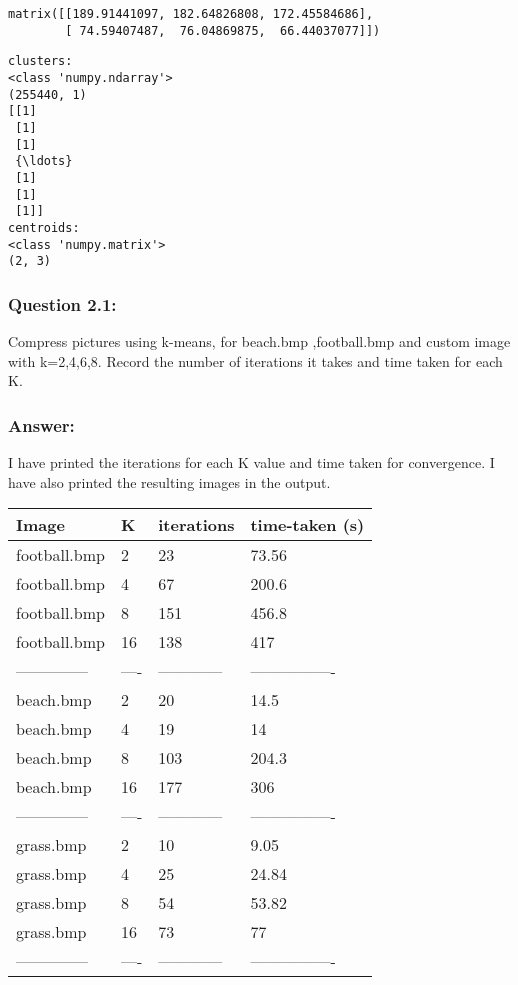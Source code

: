 \documentclass[11pt]{article}
\begin{document}
    
    \begin{verbatim}
matrix([[189.91441097, 182.64826808, 172.45584686],
        [ 74.59407487,  76.04869875,  66.44037077]])
    \end{verbatim}

    
    \begin{Verbatim}[commandchars=\\\{\}]
clusters:
<class 'numpy.ndarray'>
(255440, 1)
[[1]
 [1]
 [1]
 {\ldots}
 [1]
 [1]
 [1]]
centroids:
<class 'numpy.matrix'>
(2, 3)
    \end{Verbatim}

    \hypertarget{question-2.1}{%
\subsubsection{Question 2.1:}\label{question-2.1}}

Compress pictures using k-means, for beach.bmp ,football.bmp and custom
image with k=2,4,6,8. Record the number of iterations it takes and time
taken for each K.

\hypertarget{answer}{%
\subsubsection{Answer:}\label{answer}}

I have printed the iterations for each K value and time taken for
convergence. I have also printed the resulting images in the output.

\begin{longtable}[]{@{}llll@{}}
\toprule
Image & K & iterations & time-taken (s) \\
\midrule
\endhead
football.bmp & 2 & 23 & 73.56 \\
football.bmp & 4 & 67 & 200.6 \\
football.bmp & 8 & 151 & 456.8 \\
football.bmp & 16 & 138 & 417 \\
-------------- & ---- & ------------ & ---------------- \\
beach.bmp & 2 & 20 & 14.5 \\
beach.bmp & 4 & 19 & 14 \\
beach.bmp & 8 & 103 & 204.3 \\
beach.bmp & 16 & 177 & 306 \\
-------------- & ---- & ------------ & ---------------- \\
grass.bmp & 2 & 10 & 9.05 \\
grass.bmp & 4 & 25 & 24.84 \\
grass.bmp & 8 & 54 & 53.82 \\
grass.bmp & 16 & 73 & 77 \\
-------------- & ---- & ------------ & ---------------- \\
\bottomrule
\end{longtable}
\end{document}
